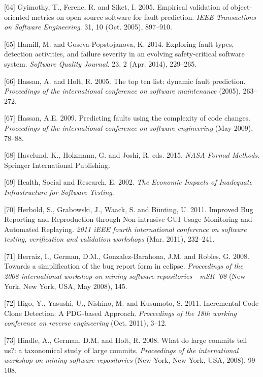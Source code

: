 \documentclass[12pt]{report}
\begin{document}
\hypertarget{ref-Gyimothy2005}{}
{[}64{]} Gyimothy, T., Ferenc, R. and Siket, I. 2005. Empirical
validation of object-oriented metrics on open source software for fault
prediction. \emph{IEEE Transactions on Software Engineering}. 31, 10
(Oct. 2005), 897--910.

\hypertarget{ref-Hamill2014}{}
{[}65{]} Hamill, M. and Goseva-Popstojanova, K. 2014. Exploring fault
types, detection activities, and failure severity in an evolving
safety-critical software system. \emph{Software Quality Journal}. 23, 2
(Apr. 2014), 229--265.

\hypertarget{ref-Hassan2005}{}
{[}66{]} Hassan, A. and Holt, R. 2005. The top ten list: dynamic fault
prediction. \emph{Proceedings of the international conference on
software maintenance} (2005), 263--272.

\hypertarget{ref-Hassan2009}{}
{[}67{]} Hassan, A.E. 2009. Predicting faults using the complexity of
code changes. \emph{Proceedings of the international conference on
software engineering} (May 2009), 78--88.

\hypertarget{ref-Havelund2015}{}
{[}68{]} Havelund, K., Holzmann, G. and Joshi, R. eds. 2015. \emph{NASA
Formal Methods}. Springer International Publishing.

\hypertarget{ref-HealthSocial2002}{}
{[}69{]} Health, Social and Research, E. 2002. \emph{The Economic
Impacts of Inadequate Infrastructure for Software Testing}.

\hypertarget{ref-Herbold2011}{}
{[}70{]} Herbold, S., Grabowski, J., Waack, S. and Bünting, U. 2011.
Improved Bug Reporting and Reproduction through Non-intrusive GUI Usage
Monitoring and Automated Replaying. \emph{2011 iEEE fourth international
conference on software testing, verification and validation workshops}
(Mar. 2011), 232--241.

\hypertarget{ref-Herraiz2008}{}
{[}71{]} Herraiz, I., German, D.M., Gonzalez-Barahona, J.M. and Robles,
G. 2008. Towards a simplification of the bug report form in eclipse.
\emph{Proceedings of the 2008 international workshop on mining software
repositories - mSR '08} (New York, New York, USA, May 2008), 145.

\hypertarget{ref-Higo2011}{}
{[}72{]} Higo, Y., Yasushi, U., Nishino, M. and Kusumoto, S. 2011.
Incremental Code Clone Detection: A PDG-based Approach.
\emph{Proceedings of the 18th working conference on reverse engineering}
(Oct. 2011), 3--12.

\hypertarget{ref-Hindle2008}{}
{[}73{]} Hindle, A., German, D.M. and Holt, R. 2008. What do large
commits tell us?: a taxonomical study of large commits.
\emph{Proceedings of the international workshop on mining software
repositories} (New York, New York, USA, 2008), 99--108.
\end{document}

